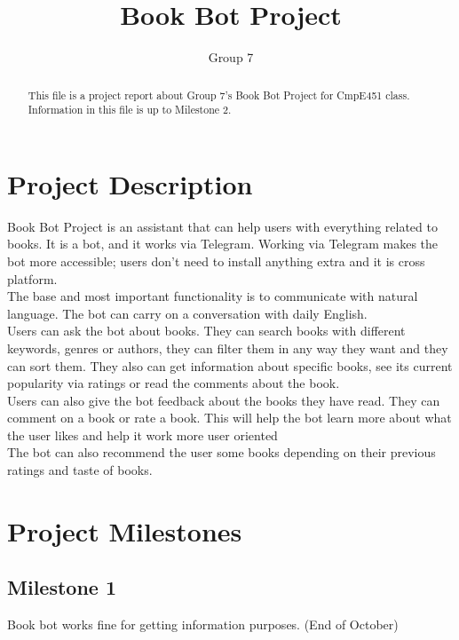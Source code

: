 \documentclass[a4paper]{article}
\title{Book Bot Project}
\author{Group 7}
\begin{document}
\maketitle

\begin{abstract}
This file is a project report about Group 7's Book Bot Project for CmpE451 class. Information in this file is up to Milestone 2.
\end{abstract}

\section{Project Description}

 \qquad Book Bot Project is an assistant that can help users with everything related to books. It is a bot, and it works via Telegram. Working via Telegram makes the bot more accessible; users don't need to install anything extra and it is cross platform. \\
  
  
  \quad The base and most important functionality is to communicate with natural language. The bot can carry on a conversation with daily English. \\
 
  
  \quad Users can ask the bot about books. They can search books with different keywords, genres or authors, they can filter them in any way they want and they can sort them. They also can get information about specific books, see its current popularity via ratings or read the comments about the book.\\
 
  
  \quad Users can also give the bot feedback about the books they have read. They can comment on a book or rate a book. This will help the bot learn more about what the user likes and help it work more user oriented \\
 
  
  \quad The bot can also recommend the user some books depending on their previous ratings and taste of books.



\section{Project Milestones}
\subsection{Milestone 1}
Book bot works fine for getting information purposes. (End of October)
\end{document}
